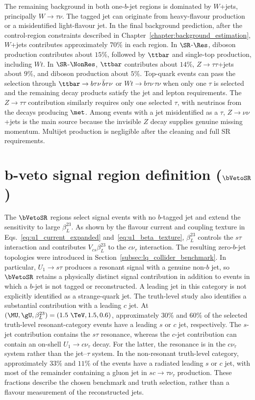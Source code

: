 The remaining background in both one-$b$-jet regions is dominated by $W$+jets, principally $W\to\tau\nu$.
The tagged jet can originate from heavy-flavour production or a misidentified light-flavour jet.
In the final background prediction, after the control-region constraints described in Chapter~\ref{chapter:background_estimation}, $W$+jets contributes approximately $70\%$ in each region.
In $\SR$-$\Res$, diboson production contributes about $15\%$, followed by $\ttbar$ and single-top production, including $Wt$.
In $\SR$-$\NonRes$, $\ttbar$ contributes about $14\%$, $Z\to\tau\tau$+jets about $9\%$, and diboson production about $5\%$.
Top-quark events can pass the selection through $\ttbar\to b\tau\nu\,\bar b\tau\nu$ or $Wt\to b\tau\nu\,\tau\nu$ when only one $\tau$ is selected and the remaining decay products satisfy the jet and lepton requirements.
The $Z\to\tau\tau$ contribution similarly requires only one selected $\tau$, with neutrinos from the decays producing $\met$.
Among events with a jet misidentified as a $\tau$, $Z\to\nu\nu$+jets is the main source because the invisible $Z$ decay supplies genuine missing momentum.
Multijet production is negligible after the cleaning and full SR requirements.

\clearpage
\section[b-veto signal region definition (SR0b)]{b-veto signal region definition ($\bVetoSR$)}
\label{sec:ch7_sr0b}

The $\bVetoSR$ regions select signal events with no $b$-tagged jet and extend the sensitivity to large $\beta_L^{23}$.
As shown by the flavour current and coupling texture in Eqs.~\ref{eq:u1_current_expanded} and~\ref{eq:u1_beta_texture}, $\beta_L^{23}$ controls the $s\tau$ interaction and contributes $V_{cs}\beta_L^{23}$ to the $c\nu_\tau$ interaction.
The resulting zero-$b$-jet topologies were introduced in Section~\ref{subsec:lq_collider_benchmark}.
In particular, $U_1\to s\tau$ produces a resonant signal with a genuine non-$b$ jet, so $\bVetoSR$ retains a physically distinct signal contribution in addition to events in which a $b$-jet is not tagged or reconstructed.
A leading jet in this category is not explicitly identified as a strange-quark jet.
The truth-level study also identifies a substantial contribution with a leading $c$ jet.
At $(\MU,\gU,\beta_L^{23})=(1.5~\TeV,1.5,0.6)$, approximately $30\%$ and $60\%$ of the selected truth-level resonant-category events have a leading $s$ or $c$ jet, respectively.
The $s$-jet contribution contains the $s\tau$ resonance, whereas the $c$-jet contribution can contain an on-shell $U_1\to c\nu_\tau$ decay.
For the latter, the resonance is in the $c\nu_\tau$ system rather than the jet--$\tau$ system.
In the non-resonant truth-level category, approximately $33\%$ and $11\%$ of the events have a radiated leading $s$ or $c$ jet, with most of the remainder containing a gluon jet in $sc\to\tau\nu_\tau$ production.
These fractions describe the chosen benchmark and truth selection, rather than a flavour measurement of the reconstructed jets.

